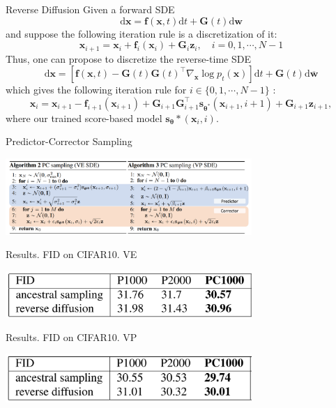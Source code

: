 \documentclass[xcolor=dvipsnames]{beamer}
\begin{document}
    \begin{frame}{Reverse Diffusion}
        Given a forward SDE
$$
\mathrm{d} \mathbf{x}=\mathbf{f}(\mathbf{x}, t) \mathrm{d} t+\mathbf{G}(t) \mathrm{d} \mathbf{w}
$$
and suppose the following iteration rule is a discretization of it:
$$
\mathbf{x}_{i+1}=\mathbf{x}_i+\mathbf{f}_i\left(\mathbf{x}_i\right)+\mathbf{G}_i \mathbf{z}_i, \quad i=0,1, \cdots, N-1
$$
Thus, one can propose to discretize the reverse-time SDE
$$
\mathrm{d} \mathbf{x}=\left[\mathbf{f}(\mathbf{x}, t)-\mathbf{G}(t) \mathbf{G}(t)^{\top} \nabla_{\mathbf{x}} \log p_t(\mathbf{x})\right] \mathrm{d} t+\mathbf{G}(t) \mathrm{d} \overline{\mathbf{w}}
$$
which gives the following iteration rule for $i \in\{0,1, \cdots, N-1\}$ :
$$
\mathbf{x}_i=\mathbf{x}_{i+1}-\mathbf{f}_{i+1}\left(\mathbf{x}_{i+1}\right)+\mathbf{G}_{i+1} \mathbf{G}_{i+1}^{\top} \mathbf{s}_{\boldsymbol{\theta}^*}\left(\mathbf{x}_{i+1}, i+1\right)+\mathbf{G}_{i+1} \mathbf{z}_{i+1},
$$
where our trained score-based model $\mathbf{s}_{\boldsymbol{\theta}} *\left(\mathbf{x}_i, i\right)$.
    \end{frame}

    \begin{frame}{Predictor-Corrector Sampling}
        \begin{center}
            \includegraphics[width=0.7\textwidth]{pics/PC.png}
        \end{center}
    \end{frame}

    \begin{frame}{Results. FID on CIFAR10. VE}            
        \begin{center}
            \includegraphics[width=0.7\textwidth]{pics/VE_table.png}
        \end{center}
    \end{frame}


    \begin{frame}{Results. FID on CIFAR10. VP}            
        \begin{center}
            \includegraphics[width=0.7\textwidth]{pics/VP_table.png}
        \end{center}
    \end{frame}

    
\end{document}
